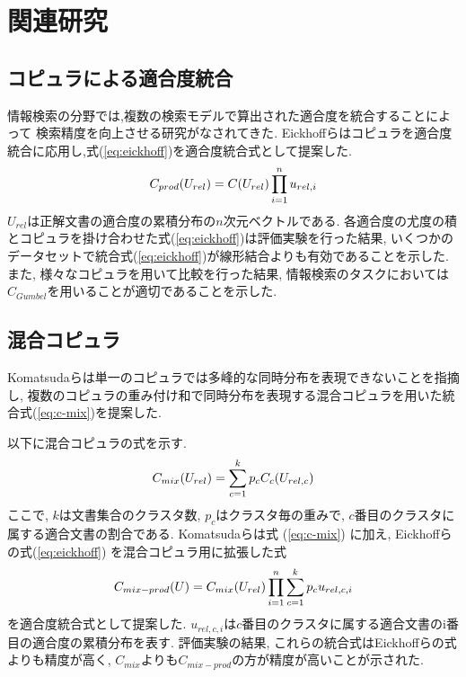 \chapter{関連研究}
\section{コピュラによる適合度統合}
情報検索の分野では,複数の検索モデルで算出された適合度を統合することによって
検索精度を向上させる研究がなされてきた\cite{IR-1}\cite{IR-2}\cite{IR-3}.
Eickhoffら\cite{copulaInf}はコピュラを適合度統合に応用し,式(\ref{eq:eickhoff})を適合度統合式として提案した.
\begin{equation}
  \label{eq:eickhoff}
     \centering
  C_{prod}(U_{rel}) = C(U_{rel}) \prod_{i=1}^n u_{rel,i}
\end{equation}
$U_{rel}$は正解文書の適合度の累積分布の$n$次元ベクトルである.
各適合度の尤度の積とコピュラを掛け合わせた式(\ref{eq:eickhoff})は評価実験を行った結果, いくつかのデータセットで統合式(\ref{eq:eickhoff})が線形結合よりも有効であることを示した.
また, 様々なコピュラを用いて比較を行った結果, 情報検索のタスクにおいては$C_{Gumbel}$を用いることが適切であることを示した\cite{copulaEickhoff}.
\section{混合コピュラ}
Komatsudaら\cite{Komatsuda}は単一のコピュラでは多峰的な同時分布を表現できないことを指摘し,
複数のコピュラの重み付け和で同時分布を表現する混合コピュラを用いた統合式(\ref{eq:c-mix})を提案した.
\begin{comment}
混合コピュラを構築する手順を以下に示す.
\begin{enumerate}
\item 適合文書のクラスタリングを行う.
\item クラスタごとに周辺分布, コピュラのパラメータ推定を行う.
\item 各クラスタのコピュラを足し合わせ混合コピュラを算出する.
\end{enumerate}
\end{comment}
    以下に混合コピュラの式を示す.
    \begin{equation}
        \label{eq:c-mix}
        \centering
        C_{mix}(U_{rel})= \sum_{c=1}^{k} p_{c}C_{c}(U_{rel, c})
    \end{equation}
    ここで, $k$は文書集合のクラスタ数, $p_c$はクラスタ毎の重みで, $c$番目のクラスタに属する適合文書の割合である.
  Komatsudaらは式 (\ref{eq:c-mix}) に加え, Eickhoffらの式(\ref{eq:eickhoff}) を混合コピュラ用に拡張した式
\begin{equation}
     \label{eq:c-mix-prod}
     \centering
      C_{mix-prod}(U)= C_{mix}(U_{rel})\prod_{i=1}^n \sum_{c=1}^{k} p_{c}u_{rel,c, i}
\end{equation}
を適合度統合式として提案した. $u_{rel,c, i}$は$c$番目のクラスタに属する適合文書のi番目の適合度の累積分布を表す.
評価実験の結果, これらの統合式はEickhoffらの式よりも精度が高く, $C_{mix}$よりも$C_{mix-prod}$の方が精度が高いことが示された.


